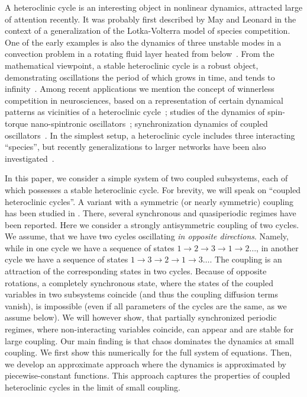 \documentclass[3p,number,review,sort&compress]{elsarticle}
\begin{document}
A heteroclinic cycle is an interesting object in nonlinear dynamics, attracted large of attention recently. It was probably first described by May and Leonard \cite{May-Leonard-75}
in the context of a generalization of the Lotka-Volterra model of species competition. One
of the early examples is also the dynamics of three unstable modes in a convection
problem in a rotating fluid layer heated from below~\cite{MR1708859}. From
the mathematical viewpoint, a stable heteroclinic cycle is a robust object, demonstrating
oscillations the period of which grows in time, and tends to infinity~\cite{MR913462,MR1437986}.
Among recent applications we mention the concept of winnerless competition in neurosciences, based on a representation of certain dynamical patterns as vicinities of a heteroclinic cycle~\cite{MR2063888,MR2513781}; studies of the dynamics of spin-torque nano-spintronic oscillators~\cite{PhysRevB.84.104414}; synchronization dynamics
of coupled oscillators~\cite{MR4030395}. In the simplest setup, a heteroclinic cycle includes three interacting ``species'', but recently generalizations to larger networks have been also investigated~\cite{TACHIKAWA2007374,10.1143/PTP.109.133,voit2019dynamics,Voit_etal-20}.

In this paper, we consider a simple system of two coupled
subsystems, each of which possesses a stable heteroclinic cycle.
For brevity, we will speak on ``coupled heteroclinic cycles''. A variant with a symmetric (or nearly symmetric) coupling has been studied in \cite{PhysRevE.85.016215}. There, several synchronous and quasiperiodic regimes have been reported. Here we consider a strongly antisymmetric coupling of two cycles. We assume, that we have two cycles oscillating
\textit{in opposite directions}. Namely, while in one cycle we have a sequence of states $1\to 2\to 3 \to 1\to 2\ldots$, in another cycle we have a sequence of states $1\to 3 \to 2 \to 1 \to 3 \ldots$. The coupling is an attraction of the corresponding states in two cycles. Because of opposite rotations, a completely synchronous state, where the states of the coupled variables  in two subsystems coincide (and thus the coupling diffusion terms vanish),  is impossible (even if all parameters of the cycles are the same, as we assume below). We will however show, that partially synchronized periodic regimes, where
non-interacting variables coincide, can appear and are stable for large coupling. Our main finding is that chaos dominates the dynamics at small coupling. We first show this numerically for the full system of equations. Then, we develop an approximate approach where the dynamics is approximated by piecewise-constant functions. This approach captures the properties of coupled heteroclinic cycles in the limit of small coupling.
\end{document}
